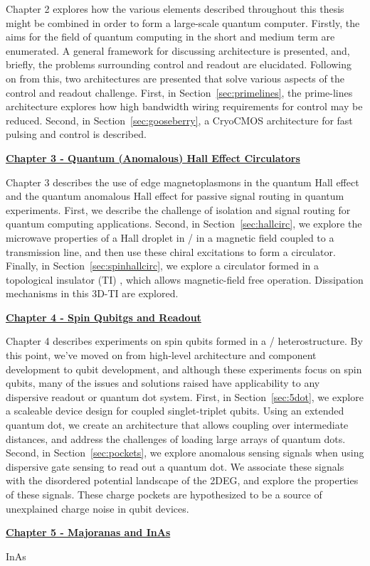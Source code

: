 \noindent
Chapter 2 explores how the various elements described throughout this thesis might be combined in order to form
a large-scale quantum computer. Firstly, the aims for the field of quantum computing in the short and medium term are
enumerated. A general framework for discussing architecture is presented, and, briefly, the problems surrounding control
and readout are elucidated. Following on from this, two architectures are presented that solve various aspects of the control
and readout challenge. First, in Section~\ref{sec:primelines}, the prime-lines architecture explores how high bandwidth
wiring requirements for control may be reduced. Second, in Section~\ref{sec:gooseberry}, a CryoCMOS architecture for fast
pulsing and control is described.

\medskip
\noindent\textbf{\hyperref[sec:hall]{Chapter 3 - Quantum (Anomalous) Hall Effect Circulators}}

\noindent
Chapter 3 describes the use of edge magnetoplasmons in the quantum Hall effect and the quantum anomalous Hall effect
for passive signal routing in quantum experiments. First, we describe the challenge of isolation and signal routing
for quantum computing applications. Second, in Section~\ref{sec:hallcirc}, we explore the microwave properties of a
Hall droplet in / in a magnetic field coupled to a transmission line, and then use these chiral
excitations to form a circulator. Finally, in Section~\ref{sec:spinhallcirc}, we explore a circulator formed in a topological
insulator (TI) , which allows magnetic-field free operation. Dissipation mechanisms in this 3D-TI
are explored.

\medskip
\noindent\textbf{\hyperref[sec:spinqubit]{Chapter 4 - Spin Qubitgs and Readout}}

\noindent
Chapter 4 describes experiments on spin qubits formed in a / heterostructure. By this point, we've moved
on from high-level architecture and component development to qubit development, and although these experiments focus on
spin qubits, many of the issues and solutions raised have applicability to any dispersive readout or quantum dot system.
First, in Section~\ref{sec:5dot}, we explore a scaleable device design for coupled singlet-triplet qubits. Using an
extended quantum dot, we create an architecture that allows coupling over intermediate distances, and address the challenges
of loading large arrays of quantum dots. Second, in Section~\ref{sec:pockets}, we explore anomalous sensing signals when
using dispersive gate sensing to read out a quantum dot. We associate these signals with the disordered potential landscape
of the 2DEG, and explore the properties of these signals. These charge pockets are hypothesized to be a source of unexplained
charge noise in qubit devices.

\medskip
\noindent\textbf{\hyperref[sec:majoinas]{Chapter 5 - Majoranas and InAs}}

\noindent
InAs

